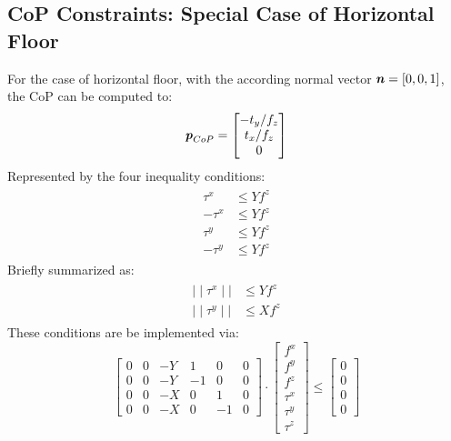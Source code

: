 \subsection{CoP Constraints: Special Case of Horizontal Floor}
For the case of horizontal floor, with the according normal vector $\bm{\mathit{n}}=[0,0,1]$, the \gls{CoP} can be computed to: 
\begin{equation}
\bm{\mathit{p}}_{CoP} = \begin{bmatrix} -t_y/f_z \\ t_x/f_z \\ 0 \end{bmatrix}
\end{equation}
Represented by the four inequality conditions:
\begin{align}
\begin{split}
\tau^x &\leq Yf^z \\
-\tau^x &\leq Yf^z \\
\tau^y &\leq Yf^z \\
-\tau^y &\leq Yf^z 
\end{split}
\end{align}
Briefly summarized as:
\begin{align}
\begin{split}
\mid\mid\tau^x\mid\mid &\leq Yf^z \\
\mid\mid\tau^y\mid\mid &\leq Xf^z 
\end{split}
\end{align}
These conditions are be implemented via: 
\begin{equation}
\begin{bmatrix} 0 & 0 & -Y & 1 & 0 & 0 \\
0 & 0 & -Y & -1 & 0 & 0 \\
0 & 0 & -X & 0 & 1 & 0 \\
0 & 0 & -X & 0 & -1 & 0 \end{bmatrix} \cdot
\begin{bmatrix} f^x \\ f^y \\ f^z \\ \tau^x \\ \tau^y \\ \tau^z \end{bmatrix} \leq
\begin{bmatrix} 0 \\ 0 \\ 0 \\ 0 \end{bmatrix}
\end{equation}





